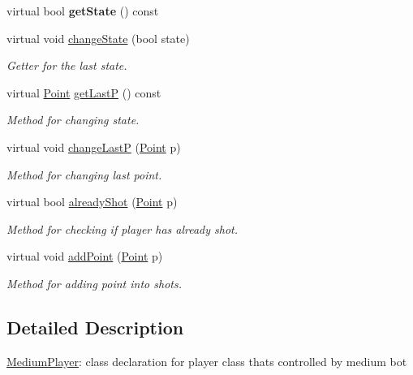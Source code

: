 \begin{DoxyCompactItemize}
\mbox{\label{class_medium_player_a90a8cd5feeaa759043af77afe266907c}} 
virtual bool {\bfseries get\+State} () const
\item 
\mbox{\label{class_medium_player_ae0f69d678d6567e09baed0350468be61}} 
virtual void \mbox{\hyperlink{class_medium_player_ae0f69d678d6567e09baed0350468be61}{change\+State}} (bool state)
\begin{DoxyCompactList}\small\item\em Getter for the last state. \end{DoxyCompactList}\item 
\mbox{\label{class_medium_player_abd585986250a5b713d6a554ea70e3ba6}} 
virtual \mbox{\hyperlink{class_point}{Point}} \mbox{\hyperlink{class_medium_player_abd585986250a5b713d6a554ea70e3ba6}{get\+LastP}} () const
\begin{DoxyCompactList}\small\item\em Method for changing state. \end{DoxyCompactList}\item 
virtual void \mbox{\hyperlink{class_medium_player_afc952f7dac91d979743154c021d8dee8}{change\+LastP}} (\mbox{\hyperlink{class_point}{Point}} p)
\begin{DoxyCompactList}\small\item\em Method for changing last point. \end{DoxyCompactList}\item 
virtual bool \mbox{\hyperlink{class_medium_player_a0c237af510ff84898759ed2e9a9271ce}{already\+Shot}} (\mbox{\hyperlink{class_point}{Point}} p)
\begin{DoxyCompactList}\small\item\em Method for checking if player has already shot. \end{DoxyCompactList}\item 
virtual void \mbox{\hyperlink{class_medium_player_a4cd5cbf0327e002112c80a52b279358f}{add\+Point}} (\mbox{\hyperlink{class_point}{Point}} p)
\begin{DoxyCompactList}\small\item\em Method for adding point into shots. \end{DoxyCompactList}\end{DoxyCompactItemize}


\subsection{Detailed Description}
\mbox{\hyperlink{class_medium_player}{Medium\+Player}}\+: class declaration for player class that\textquotesingle{}s controlled by medium bot 

